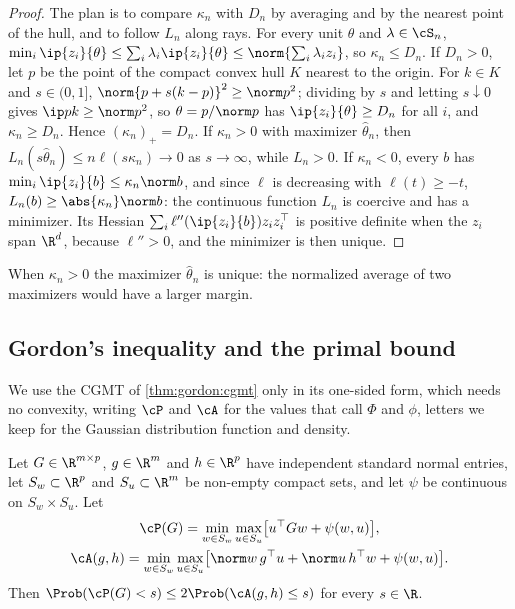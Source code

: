 \begin{refsection}
\begin{proof}
The plan is to compare $\kappa_n$ with $D_n$ by averaging and by the nearest point of the hull, and to follow $L_n$ along rays. For every unit $\theta$ and $\lambda\in\cS_n$, $\min_i\ip{z_i}{\theta}\le\sum_i\lambda_i\ip{z_i}{\theta}\le\norm{\sum_i\lambda_iz_i}$, so $\kappa_n\le D_n$. If $D_n>0$, let $p$ be the point of the compact convex hull $K$ nearest to the origin. For $k\in K$ and $s\in(0,1]$, $\norm{p+s(k-p)}^2\ge\norm p^2$; dividing by $s$ and letting $s\downarrow0$ gives $\ip pk\ge\norm p^2$, so $\theta=p/\norm p$ has $\ip{z_i}{\theta}\ge D_n$ for all $i$, and $\kappa_n\ge D_n$. Hence $(\kappa_n)_+=D_n$. If $\kappa_n>0$ with maximizer $\hat\theta_n$, then $L_n(s\hat\theta_n)\le n\ell(s\kappa_n)\to0$ as $s\to\infty$, while $L_n>0$. If $\kappa_n<0$, every $b$ has $\min_i\ip{z_i}{b}\le\kappa_n\norm b$, and since $\ell$ is decreasing with $\ell(t)\ge-t$, $L_n(b)\ge\abs{\kappa_n}\norm b$: the continuous function $L_n$ is coercive and has a minimizer. Its Hessian $\sum_i\ell''(\ip{z_i}{b})z_iz_i^\top$ is positive definite when the $z_i$ span $\R^d$, because $\ell''>0$, and the minimizer is then unique.
\end{proof}

When $\kappa_n>0$ the maximizer $\hat\theta_n$ is unique: the normalized average of two maximizers would have a larger margin.

\subsection{Gordon's inequality and the primal bound}

We use the CGMT of \cref{thm:gordon:cgmt} only in its one-sided form, which needs no convexity, writing $\cP$ and $\cA$ for the values that \textcite{ThrampoulidisAbbasiHassibi2018} call $\Phi$ and $\phi$, letters we keep for the Gaussian distribution function and density.

\begin{theorem*}
Let $G\in\R^{m\times p}$, $g\in\R^m$ and $h\in\R^p$ have independent standard normal entries, let $S_w\subset\R^p$ and $S_u\subset\R^m$ be non-empty compact sets, and let $\psi$ be continuous on $S_w\times S_u$. Let
\begin{gather*}
\cP(G)=\min_{w\in S_w}\max_{u\in S_u}\bigl[u^\top Gw+\psi(w,u)\bigr],\\
\cA(g,h)=\min_{w\in S_w}\max_{u\in S_u}\bigl[\norm w\,g^\top u+\norm u\,h^\top w+\psi(w,u)\bigr].
\end{gather*}
Then $\Prob(\cP(G)<s)\le2\Prob(\cA(g,h)\le s)$ for every $s\in\R$.
\end{theorem*}


\end{refsection}
